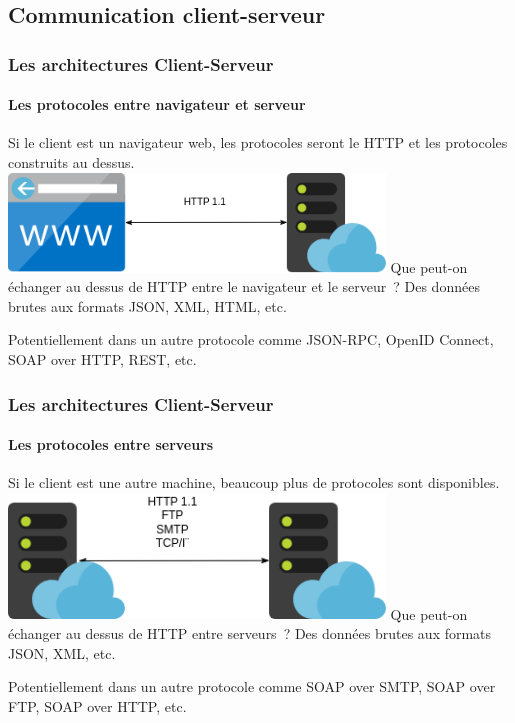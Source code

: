 \documentclass{beamer}
\begin{document}
    \subsection{Communication client-serveur}\label{subsec:web-com-server-client}

    \begin{frame}
        \transdissolve
        \frametitle{Les architectures Client-Serveur}
        \framesubtitle{Les protocoles entre navigateur et serveur}
        Si le client est un navigateur web, les protocoles seront le HTTP et les protocoles construits au dessus.
        \bigbreak
        \centering
        \includegraphics[width=10cm]{image/browser-soa-protocols.drawio}
        \flushleft
        Que peut-on échanger au dessus de HTTP entre le navigateur et le serveur~?
        \pause
        \bigbreak
        Des données brutes aux formats JSON, XML, HTML, etc.

        Potentiellement dans un autre protocole comme JSON-RPC, OpenID Connect, SOAP over HTTP, REST, etc.
    \end{frame}

    \begin{frame}
        \transdissolve
        \frametitle{Les architectures Client-Serveur}
        \framesubtitle{Les protocoles entre serveurs}
        Si le client est une autre machine, beaucoup plus de protocoles sont disponibles.
        \bigbreak
        \centering
        \includegraphics[width=10cm]{image/m2m-soa-protocols.drawio}
        \flushleft
        Que peut-on échanger au dessus de HTTP entre serveurs~?
        \pause
        \bigbreak
        Des données brutes aux formats JSON, XML, etc.

        Potentiellement dans un autre protocole comme SOAP over SMTP, SOAP over FTP, SOAP over HTTP, etc.
    \end{frame}
\end{document}
